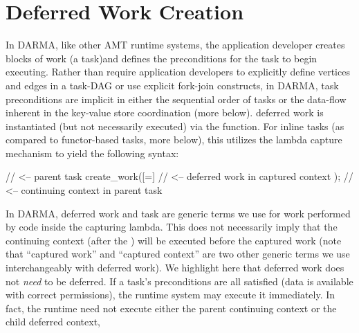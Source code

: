 \section{Deferred Work Creation}
\label{sec:deferred}
In \gls{DARMA}, like other \gls{AMT} \glspl{runtime system}, 
the application developer creates blocks of work (a \gls{task})and defines the
\glspl{precondition} for the \gls{task} to begin executing.
Rather than require application developers to explicitly define vertices and
edges in a \gls{task-DAG} or use explicit \gls{fork-join} constructs,
in \gls{DARMA}, \gls{task} \glspl{precondition} are implicit in either the sequential 
order of \glspl{task} or the data-flow inherent in the \gls{key-value store}
coordination (more below).
\Gls{deferred work} is instantiated (but not necessarily executed) via the  function. 
For inline \glspl{task} (as compared to functor-based \glspl{task}, more
below), this utilizes the \CC{} \gls{lambda} \gls{capture} mechanism to yield the following syntax:

\begin{CppCode}
// <-- parent task
create_work([=]{
  // <-- deferred work in captured context
});
// <-- continuing context in parent task
\end{CppCode}

In \gls{DARMA}, \gls{deferred work} and \gls{task} are generic terms we use for work
performed by code inside the capturing \gls{lambda}.
This does not necessarily imply that the \gls{continuing context} (after the ) will be
executed before the \gls{captured work} (note that ``\gls{captured work}'' and
``\gls{captured context}'' are two other generic terms we use interchangeably
with \gls{deferred work}).  
We highlight here that \gls{deferred work} does not \emph{need} to be deferred.
If a \gls{task}'s \glspl{precondition} are all satisfied (data is available with correct permissions),
the \gls{runtime system} may execute it immediately.  
In fact, the runtime need not execute either the parent continuing context or the child deferred context,

